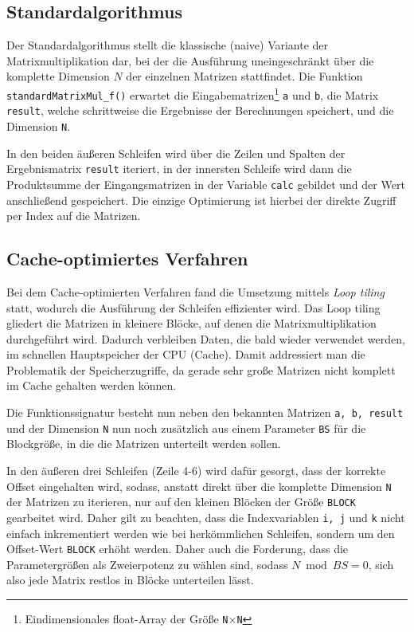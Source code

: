 \documentclass[a4paper,11pt]{scrartcl}
\begin{document}
\subsection{Standardalgorithmus}
Der Standardalgorithmus stellt die klassische (naive) Variante der Matrixmultiplikation
dar, bei der die Ausführung uneingeschränkt über die komplette Dimension $N$ der einzelnen Matrizen 
stattfindet. Die Funktion \texttt{standardMatrixMul\_f()} erwartet die Eingabematrizen\footnote{
Eindimensionales float-Array der Größe \texttt{N$\times$N}} \texttt{a} und \texttt{b},
die Matrix \texttt{result}, welche schrittweise die Ergebnisse der Berechnungen speichert, 
und die Dimension \texttt{N}.\newline




In den beiden äußeren Schleifen 
wird über die Zeilen und Spalten der Ergebnismatrix \texttt{result} iteriert,
in der innersten Schleife wird dann die Produktsumme der Eingangsmatrizen in der
Variable \texttt{calc} gebildet und der Wert anschließend gespeichert.
Die einzige Optimierung ist hierbei der direkte Zugriff per Index auf die Matrizen.


\subsection{Cache-optimiertes Verfahren}
Bei dem Cache-optimierten Verfahren fand die Umsetzung mittels \emph{Loop tiling} statt,
wodurch die Ausführung der Schleifen effizienter wird. Das Loop tiling gliedert die 
Matrizen in kleinere Blöcke, auf denen die Matrixmultiplikation durchgeführt wird.
Dadurch verbleiben Daten, die bald wieder verwendet werden, im schnellen Hauptspeicher der 
CPU (Cache). Damit addressiert man die Problematik der Speicherzugriffe, da gerade sehr große
Matrizen nicht komplett im Cache gehalten werden können.



Die Funktionssignatur besteht nun neben den bekannten Matrizen \texttt{a, b, result}
und der Dimension \texttt{N} nun noch zusätzlich aus einem Parameter \texttt{BS} für 
die Blockgröße, in die die Matrizen unterteilt werden sollen.\newline

In den äußeren drei Schleifen (Zeile 4-6) wird dafür gesorgt, dass der korrekte Offset eingehalten wird,
sodass, anstatt direkt über die komplette Dimension \texttt{N} der Matrizen zu iterieren, nur auf den
kleinen Blöcken der Größe \texttt{BLOCK} gearbeitet wird. Daher gilt zu beachten, dass die Indexvariablen
\texttt{i,~j} und \texttt{k} nicht einfach inkrementiert werden wie bei herkömmlichen Schleifen,
sondern um den Offset-Wert \texttt{BLOCK} erhöht werden. Daher auch die Forderung, dass 
die Parametergrößen als Zweierpotenz zu wählen sind, sodass $N \bmod BS = 0$, sich also jede 
Matrix restlos in Blöcke unterteilen lässt.\newline
\end{document}

